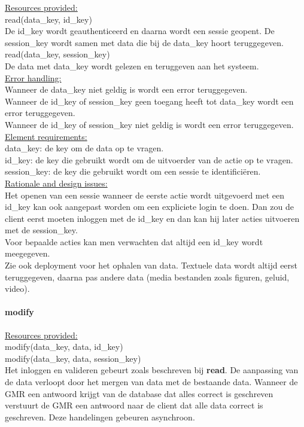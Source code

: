 \documentclass[a4paper,10pt]{article}
\begin{document}
\underline{Resources provided:}\\
read(data\_key, id\_key)\\
\indent De id\_key wordt geauthenticeerd en daarna wordt een sessie geopent.  De session\_key wordt samen met data die bij de data\_key hoort teruggegeven.\\
read(data\_key, session\_key)\\
\indent De data met data\_key wordt gelezen en teruggeven aan het systeem.\\

\underline{Error handling:}\\
Wanneer de data\_key niet geldig is wordt een error teruggegeven.\\
Wanneer de id\_key of session\_key geen toegang heeft tot data\_key wordt een error teruggegeven.\\
Wanneer de id\_key of session\_key niet geldig is wordt een error teruggegeven.\\

\underline{Element requirements:}\\
data\_key: de key om de data op te vragen.\\
id\_key: de key die gebruikt wordt om de uitvoerder van de actie op te vragen.\\
session\_key: de key die gebruikt wordt om een sessie te identifici\"{e}ren.\\

\underline{Rationale and design issues:}\\
Het openen van een sessie wanneer de eerste actie wordt uitgevoerd met een id\_key kan ook aangepast worden om een expliciete login te doen.  Dan zou de client eerst moeten inloggen met de id\_key en dan kan hij later acties uitvoeren met de session\_key.\\
Voor bepaalde acties kan men verwachten dat altijd een id\_key wordt meegegeven.\\
Zie ook deployment voor het ophalen van data.  Textuele data wordt altijd eerst teruggegeven, daarna pas andere data (media bestanden zoals figuren, geluid, video).



\paragraph{modify}
\underline{Resources provided:}\\
modify(data\_key, data, id\_key)\\
modify(data\_key, data, session\_key)\\
Het inloggen en valideren gebeurt zoals beschreven bij \textbf{read}.
De aanpassing van de data verloopt door het mergen van data met de bestaande data.  Wanneer de GMR een antwoord krijgt van de database dat alles correct is geschreven verstuurt de GMR een antwoord naar de client dat alle data correct is geschreven.  Deze handelingen gebeuren asynchroon.
\end{document}
